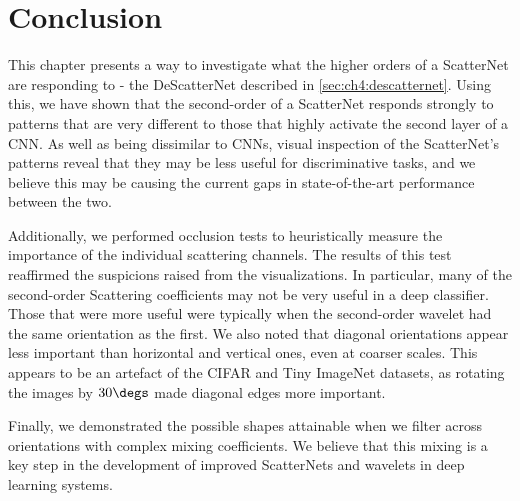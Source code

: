 \section{Conclusion}
This chapter presents a way to investigate what the higher orders of a ScatterNet
are responding to - the DeScatterNet described in \autoref{sec:ch4:descatternet}.
Using this, we have shown that the second-order of a ScatterNet
responds strongly to patterns that are very different to those that highly activate the
second layer of a CNN\@. As well as being dissimilar to CNNs, visual inspection of the
ScatterNet's patterns reveal that they may be less useful for discriminative
tasks, and we believe this may be causing the current gaps in state-of-the-art
performance between the two.

Additionally, we performed occlusion tests to heuristically measure the
importance of the individual scattering channels. The results of this test
reaffirmed the suspicions raised from the visualizations. In particular, many of
the second-order Scattering coefficients may not be very useful in a deep
classifier. Those that were more useful were typically when the second-order wavelet
had the same orientation as the first. We also noted that diagonal
orientations appear less important than horizontal and vertical ones, even at
coarser scales. This appears to be an artefact of the CIFAR and Tiny ImageNet
datasets, as rotating the images by $30\degs$ made diagonal edges more
important.

Finally, we demonstrated the possible shapes attainable when we filter
across orientations with complex mixing coefficients. We believe that this
mixing is a key step in the development of improved ScatterNets and wavelets in deep
learning systems.


